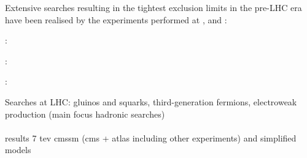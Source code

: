 Extensive searches resulting in the tightest exclusion limits in the pre-LHC era have been realised by the experiments performed at \hera, \lep and \tevatron:
\begin{description}
 \item \textbf{\hera \cite{Aid:1996es, Breitweg:1998gk}}:
 \item \textbf{\lep \cite{ALEPHSUSY, DELPHISUSY, L3SUSY, OPALSUSY, LEPLimits}}:
 \item \textbf{\tevatron \cite{CDFLimits, D0Limits, Abazov200934}}:
\end{description}
Searches at LHC: gluinos and squarks, third-generation fermions, electroweak production (main focus hadronic searches)
\\
\\
results 7 tev cmssm (cms + atlas including other experiments) and simplified models 






